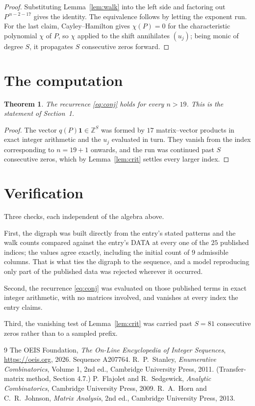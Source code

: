 \documentclass[11pt,a4paper]{article}
\theoremstyle{plain}
\newtheorem{theorem}{Theorem}
\theoremstyle{definition}
\begin{document}
\begin{proof}
Substituting Lemma~\ref{lem:walk} into the left side and factoring out
$P^{\,n-2-17}$ gives the identity. The equivalence follows by letting the exponent
run. For the last claim, Cayley--Hamilton gives $\chi(P)=0$ for the characteristic
polynomial $\chi$ of $P$, so $\chi$ applied to the shift annihilates $(u_j)$; being monic of
degree $S$, it propagates $S$ consecutive zeros forward.
\end{proof}

\section{The computation}

\begin{theorem}
The recurrence \eqref{eq:conj} holds for every $n>19$. This is the statement of
Section~1.
\end{theorem}

\begin{proof}
The vector $q(P)\mathbf{1}\in\mathbb{Z}^{S}$ was formed by $17$ matrix--vector
products in exact integer arithmetic and the $u_j$ evaluated in turn. They vanish from the
index corresponding to $n=19+1$ onwards, and the run was continued past $S$ consecutive
zeros, which by Lemma~\ref{lem:crit} settles every larger index.
\end{proof}

\section{Verification}

Three checks, each independent of the algebra above.

First, the digraph was built directly from the entry's stated patterns and the walk counts
compared against the entry's DATA at every one of the $25$ published indices; the
values agree exactly, including the initial count of $9$ admissible columns. That is
what ties the digraph to the sequence, and a model reproducing only part of the published
data was rejected wherever it occurred.

Second, the recurrence \eqref{eq:conj} was evaluated on those published terms in exact
integer arithmetic, with no matrices involved, and vanishes at every index the entry claims.

Third, the vanishing test of Lemma~\ref{lem:crit} was carried past $S=81$ consecutive
zeros rather than to a sampled prefix.

\begin{thebibliography}{9}
 The OEIS Foundation, \emph{The On-Line Encyclopedia of Integer
Sequences}, \url{https://oeis.org}, 2026. Sequence A207764.
 R.~P.~Stanley, \emph{Enumerative Combinatorics}, Volume 1, 2nd ed.,
Cambridge University Press, 2011. (Transfer-matrix method, Section 4.7.)
 P.~Flajolet and R.~Sedgewick, \emph{Analytic Combinatorics}, Cambridge
University Press, 2009.
 R.~A.~Horn and C.~R.~Johnson, \emph{Matrix Analysis}, 2nd ed., Cambridge
University Press, 2013.
\end{thebibliography}
\end{document}
